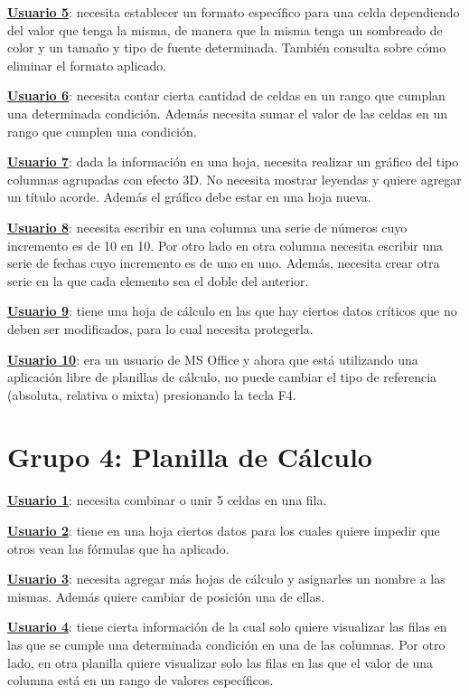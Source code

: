 \documentclass[12pt]{article}
\begin{document}
\textbf{\underline{Usuario 5}}: necesita establecer un formato específico para una celda dependiendo del valor que tenga la misma, de manera que la misma tenga un sombreado de color y un tamaño y tipo de fuente determinada. También consulta sobre cómo eliminar el formato aplicado.

\textbf{\underline{Usuario 6}}: necesita contar cierta cantidad de celdas en un rango que cumplan una determinada condición. Además necesita sumar el valor de las celdas en un rango que cumplen una condición. 

\textbf{\underline{Usuario 7}}: dada la información en una hoja, necesita realizar un gráfico del tipo columnas agrupadas con efecto 3D. No necesita mostrar leyendas y quiere agregar un título acorde. Además el gráfico debe estar en una hoja nueva.

\textbf{\underline{Usuario 8}}: necesita escribir en una columna una serie de números cuyo incremento es de 10 en 10. Por otro lado en otra columna necesita escribir una serie de fechas cuyo incremento es de uno en uno. Además, necesita crear otra serie en la que cada elemento sea el doble del anterior. 

\textbf{\underline{Usuario 9}}: tiene una hoja de cálculo en las que hay ciertos datos críticos que no deben ser modificados, para lo cual necesita protegerla.

\textbf{\underline{Usuario 10}}: era un usuario de MS Office y ahora que está utilizando una aplicación libre de planillas de cálculo, no puede cambiar el tipo de referencia (absoluta, relativa o mixta) presionando la tecla F4.

\section*{\textbf{Grupo 4: Planilla de Cálculo}}

\textbf{\underline{Usuario 1}}: necesita combinar o unir 5 celdas en una fila.

\textbf{\underline{Usuario 2}}: tiene en una hoja ciertos datos para los cuales quiere impedir que otros vean las fórmulas que ha aplicado.

\textbf{\underline{Usuario 3}}: necesita agregar más hojas de cálculo y asignarles un nombre a las mismas. Además quiere cambiar de posición una de ellas.

\textbf{\underline{Usuario 4}}: tiene cierta información de la cual solo quiere visualizar las filas en las que se cumple una determinada condición en una de las columnas. Por otro lado, en otra planilla quiere visualizar solo las filas en las que el valor de una columna está en un rango de valores específicos.
\end{document}
